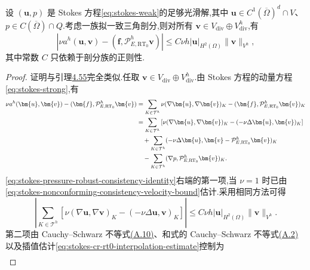 \begin{lemma}[一致性误差估计]\label{lem:stokes-pressure-robust-consistency}
设 $(\bm{u},p)$ 是 Stokes 方程\cref{eq:stokes-weak}的足够光滑解,其中 $\bm{u}\in C^1(\overline{\Omega})^d\cap V$、$p\in C(\overline{\Omega})\cap Q$.考虑一族拟一致三角剖分,则对所有 $\bm{v}\in V_{\mathrm{div}}\oplus V_{\mathrm{div}}^h$,有
\begin{equation}\label{eq:stokes-pressure-robust-consistency}
  \left|\nu a^h(\bm{u},\bm{v})
     -(\bm{f},\mathcal{P}_{E,\mathrm{RT}_0}^h\bm{v})\right|
  \leq C\nu h|\bm{u}|_{H^2(\Omega)}
       \|\bm{v}\|_{V^h},
\end{equation}
其中常数 $C$ 只依赖于剖分族的正则性.
\end{lemma}
\begin{proof}
证明与引理\hyperref[lem:stokes-nonconforming-consistency]{4.55}完全类似.任取 $\bm{v}\in V_{\mathrm{div}}\oplus V_{\mathrm{div}}^h$.由 Stokes 方程的动量方程\cref{eq:stokes-strong},有
\begin{align}\label{eq:stokes-pressure-robust-consistency-identity}
  \nu a^h(\bm{u},\bm{v})
   -(\bm{f},\mathcal{P}_{E,\mathrm{RT}_0}^h\bm{v})
  &=
  \sum_{K\in\mathcal{T}^h}
    \nu(\nabla\bm{u},\nabla\bm{v})_K
    -(\bm{f},\mathcal{P}_{E,\mathrm{RT}_0}^h\bm{v})_K\\
  &=
  \sum_{K\in\mathcal{T}^h}
    \left[\nu(\nabla\bm{u},\nabla\bm{v})_K
          -(-\nu\Delta\bm{u},\bm{v})_K\right]\notag\\
  &\quad+\sum_{K\in\mathcal{T}^h}
       (-\nu\Delta\bm{u},
          \bm{v}-\mathcal{P}_{E,\mathrm{RT}_0}^h\bm{v})_K\notag\\
  &\quad-\sum_{K\in\mathcal{T}^h}
          (\nabla p,\mathcal{P}_{E,\mathrm{RT}_0}^h\bm{v})_K.\notag
\end{align}
\cref{eq:stokes-pressure-robust-consistency-identity}右端的第一项,当 $\nu=1$ 时已由\cref{eq:stokes-nonconforming-consistency-velocity-bound}估计.采用相同方法可得
\begin{equation}\label{eq:stokes-pressure-robust-consistency-velocity}
  \left|\sum_{K\in\mathcal{T}^h}
       \left[\nu(\nabla\bm{u},\nabla\bm{v})_K
             -(-\nu\Delta\bm{u},\bm{v})_K\right]\right|
  \leq C\nu h|\bm{u}|_{H^2(\Omega)}
       \|\bm{v}\|_{V^h}.
\end{equation}
第二项由 Cauchy--Schwarz 不等式\hyperref[eq:appendix-a-10]{(A.10)}、和式的 Cauchy--Schwarz 不等式\hyperref[eq:appendix-a-2]{(A.2)}以及插值估计\cref{eq:stokes-cr-rt0-interpolation-estimate}控制为
\begin{align}\label{eq:stokes-pressure-robust-consistency-interpolation}

\end{align}
\end{proof}
